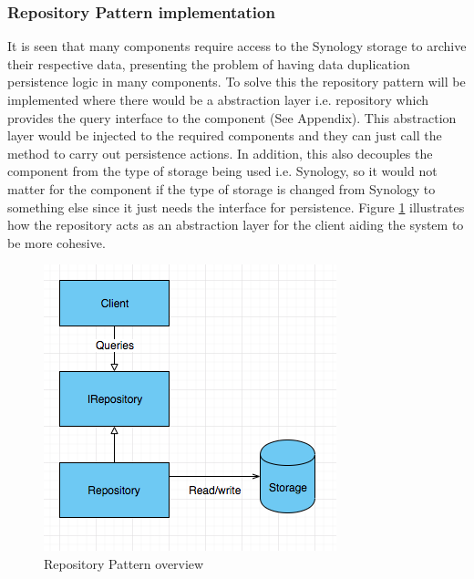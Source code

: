 \subsubsection{Repository Pattern implementation}
It is seen that many components require access to the Synology storage to archive their respective data, presenting the problem of having data duplication
persistence logic in many components. To solve this the repository pattern will be implemented where there would be a abstraction layer i.e. repository which
provides the query interface to the component (See Appendix). This abstraction layer would be injected to the required components and they can just call the 
method to carry out persistence actions. In addition, this also decouples the component from the type of storage being used i.e. Synology, so it would not
matter for the component if the type of storage is changed from Synology to something else since it just needs the interface for persistence. Figure 
\ref{fig:repositoryPattern} illustrates how the repository acts as an abstraction layer for the client aiding the system to be more cohesive.
 
\begin{figure}[H]
    \centering \includegraphics[scale=0.7]{grafiken/repositoryPattern.png}
    \caption{Repository Pattern overview}
    \label{fig:repositoryPattern}
\end{figure}


